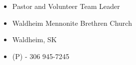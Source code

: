 \documentclass[11pt,letterpaper,sans]{moderncv}        %
\begin{document}
{
  \begin{itemize}
    \item Pastor and Volunteer Team Leader
    \item Waldheim Mennonite Brethren Church
    \item Waldheim, SK
    \item (P) - 306 945-7245
  \end{itemize}
}

\end{document}
